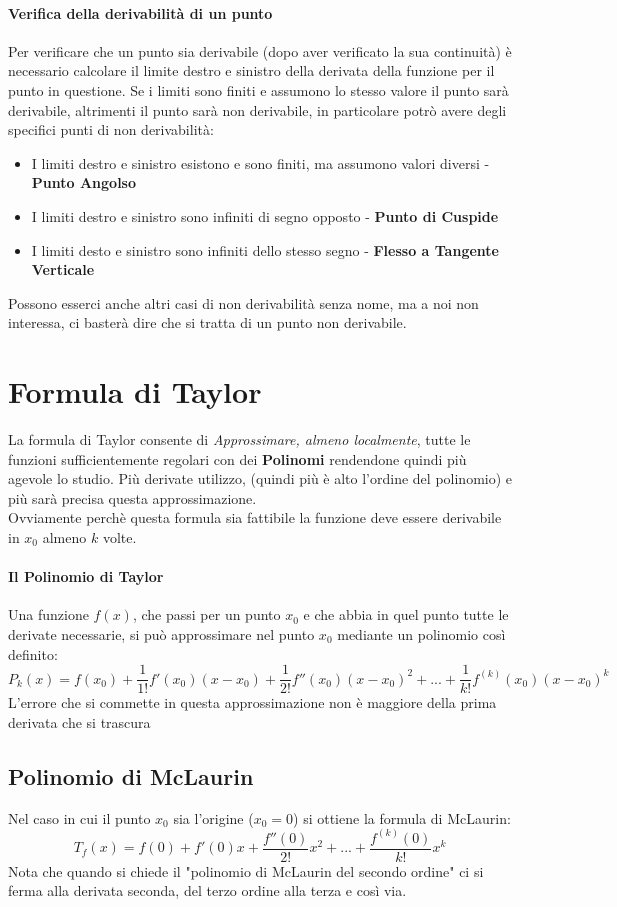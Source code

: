 \paragraph*{Verifica della derivabilità di un punto} Per verificare che un punto sia derivabile 
(dopo aver verificato la sua continuità) è necessario calcolare il limite destro e sinistro della derivata della funzione per il punto in questione.
Se i limiti sono finiti e assumono lo stesso valore il punto sarà derivabile, altrimenti il punto sarà non derivabile, in particolare potrò avere
degli specifici punti di non derivabilità:
\begin{itemize}
	\item I limiti destro e sinistro esistono e sono finiti, ma assumono valori diversi - \textbf{Punto Angolso}
	\item I limiti destro e sinistro sono infiniti di segno opposto - \textbf{Punto di Cuspide}
	\item I limiti desto e sinistro sono infiniti dello stesso segno - \textbf{Flesso a Tangente Verticale}
\end{itemize}
Possono esserci anche altri casi di non derivabilità senza nome, ma a noi non interessa, ci basterà dire che si tratta di un punto non derivabile.

\section{Formula di Taylor}
La formula di Taylor consente di \emph{Approssimare, almeno localmente}, tutte le funzioni sufficientemente regolari con dei \textbf{Polinomi}
rendendone quindi più agevole lo studio. Più derivate utilizzo, (quindi più è alto l'ordine del polinomio) e più sarà precisa questa approssimazione.
\\Ovviamente perchè questa formula sia fattibile la funzione deve essere derivabile in $x_0$ almeno $k$ volte.

\paragraph*{Il Polinomio di Taylor}
Una funzione $f(x)$, che passi per un punto $x_0$ e che abbia in quel punto tutte le derivate necessarie,
si può approssimare nel punto $x_0$ mediante un polinomio così definito:
$$P_k(x)=f(x_0)+\frac{1}{1!}f'(x_0)(x-x_0) + \frac{1}{2!}f''(x_0)(x-x_0)^2 +... + \frac{1}{k!}f^{(k)}(x_0)(x-x_0)^k$$
L'errore che si commette in questa approssimazione non è maggiore della prima derivata che si trascura
\subsection*{Polinomio di McLaurin}
Nel caso in cui il punto $x_0$ sia l'origine ($x_0=0$) si ottiene la formula di McLaurin:
$$T_f(x) = f(0) + f'(0)x + \frac{f''(0)}{2!}x^2 +...+ \frac{f^{(k)}(0)}{k!}x^k$$
Nota che quando si chiede il "polinomio di McLaurin del secondo ordine" ci si ferma alla derivata seconda, del terzo ordine alla terza e così via.
